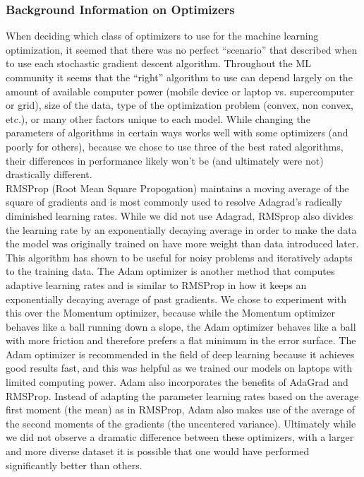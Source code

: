 \documentclass[12pt]{article}
\newcommand\tab[1][1cm]{\hspace*{#1}}
\begin{document}
\subsubsection*{Background Information on Optimizers}
\tab When deciding which class of optimizers to use for the machine learning optimization, it seemed that there was no perfect “scenario” that described when to use each stochastic gradient descent algorithm. Throughout the ML community it seems that the “right” algorithm to use can depend largely on the amount of available computer power (mobile device or laptop vs. supercomputer or grid), size of the data, type of the optimization problem (convex, non convex, etc.), or many other factors unique to each model. While changing the parameters of algorithms in certain ways works well with some optimizers (and poorly for others), because we chose to use three of the best rated algorithms, their differences in performance likely won't be (and ultimately were not) drastically different.\\
\tab RMSProp (Root Mean Square Propogation) maintains a moving average of the square of gradients and is most commonly used to resolve Adagrad’s radically diminished learning rates. While we did not use Adagrad, RMSprop also divides the learning rate by an exponentially decaying average in order to make the data the model was originally trained on have more weight than data introduced later. This algorithm has shown to be useful for noisy problems and iteratively adapts to the training data. The Adam optimizer is another method that computes adaptive learning rates and is similar to RMSProp in how it keeps an exponentially decaying average of past gradients. We chose to experiment with this over the Momentum optimizer, because while the Momentum optimizer behaves like a ball running down a slope, the Adam optimizer behaves like a ball with more friction and therefore prefers a flat minimum in the error surface. The Adam optimizer is recommended in the field of deep learning because it achieves good results fast, and this was helpful as we trained our models on laptops with limited computing power. Adam also incorporates the benefits of AdaGrad and RMSProp. Instead of adapting the parameter learning rates based on the average first moment (the mean) as in RMSProp, Adam also makes use of the average of the second moments of the gradients (the uncentered variance). Ultimately while we did not observe a dramatic difference between these optimizers, with a larger and more diverse dataset it is possible that one would have performed significantly better than others.
\end{document}
